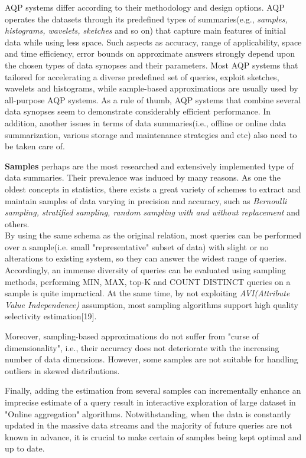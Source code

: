 \documentclass[10pt, conference, compsocconf]{IEEEtran}
\begin{document}
AQP systems differ according to their methodology and design options. AQP operates the datasets through its predefined types of summaries(e.g., \textit{samples, histograms, wavelets, sketches} and so on) that capture main features of initial data while using less space. Such aspects as accuracy, range of applicability, space and time efficiency, error bounds on approximate answers strongly depend upon the chosen types of data synopses and their parameters. Most AQP systems that tailored for accelerating a diverse predefined set of queries, exploit sketches, wavelets and histograms, while sample-based approximations are usually used by all-purpose AQP systems. As a rule of thumb, AQP systems that combine several data synopses seem to demonstrate considerably efficient performance. In addition, another issues in terms of data summaries(i.e., offline or online data summarization, various storage and maintenance strategies and etc) also need to be taken care of.

\textbf{Samples} perhaps are the most researched and extensively implemented type of data summaries. Their prevalence was induced by many reasons. As one the oldest concepts in statistics, there exists a great variety of schemes to extract and maintain samples of data varying in precision and accuracy, such as \textit{Bernoulli sampling, stratified sampling, random sampling with and without replacement} and others. \\
By using the same schema as the original relation, most queries can be performed over a sample(i.e. small "representative" subset of data) with slight or no alterations to existing system, so they can answer the widest range of queries. Accordingly, an immense diversity of queries can be evaluated using sampling methods, performing MIN, MAX, top-K and COUNT DISTINCT queries on a sample is quite impractical. At the same time, by not exploiting \textit{AVI(Attribute Value Independence)} assumption, most sampling algorithms support high quality selectivity estimation[19].

Moreover, sampling-based approximations do not suffer from "curse of dimensionality", i.e., their accuracy does not deteriorate with the increasing number of data dimensions. However, some samples are not suitable for handling outliers in skewed distributions. 

Finally, adding the estimation from several samples can incrementally enhance an imprecise estimate of a query result in interactive exploration of large dataset in "Online aggregation" algorithms. Notwithstanding, when the data is constantly updated in the massive data streams and the majority of future queries are not known in advance, it is crucial to make certain of samples being kept optimal and up to date. 
\end{document}
